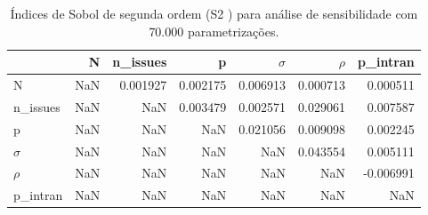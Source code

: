 \begin{table}[H]
\centering
\caption{Índices de Sobol  de segunda ordem (S2 ) para análise de
  sensibilidade com 70.000 parametrizações.}
\label{apptab2}
\begin{tabular}{l|r|r|r|r|r|r|}
\cline{2-7}
                                                        & \cellcolor[HTML]{C0C0C0}N & \cellcolor[HTML]{C0C0C0}n\_issues & \cellcolor[HTML]{C0C0C0}p & \cellcolor[HTML]{C0C0C0}\(\sigma\) & \cellcolor[HTML]{C0C0C0}\(\rho\) & \cellcolor[HTML]{C0C0C0}p\_intran \\ \hline
\multicolumn{1}{|l|}{\cellcolor[HTML]{EFEFEF}N}         & NaN                       & 0.001927                          & 0.002175                  & 0.006913                  & 0.000713                  & 0.000511                          \\ \hline
\multicolumn{1}{|l|}{\cellcolor[HTML]{EFEFEF}n\_issues} & NaN                       & NaN                               & 0.003479                  & 0.002571                  & 0.029061                  & 0.007587                          \\ \hline
\multicolumn{1}{|l|}{\cellcolor[HTML]{EFEFEF}p}         & NaN                       & NaN                               & NaN                       & 0.021056                  & 0.009098                  & 0.002245                          \\ \hline
\multicolumn{1}{|l|}{\cellcolor[HTML]{EFEFEF}\(\sigma\)}         & NaN                       & NaN                               & NaN                       & NaN                       & 0.043554                  & 0.005111                          \\ \hline
\multicolumn{1}{|l|}{\cellcolor[HTML]{EFEFEF}\(\rho\)}         & NaN                       & NaN                               & NaN                       & NaN                       & NaN                       & -0.006991                         \\ \hline
\multicolumn{1}{|l|}{\cellcolor[HTML]{EFEFEF}p\_intran} & NaN                       & NaN                               & NaN                       & NaN                       & NaN                       & NaN                               \\ \hline
\end{tabular}
\vspace{0.1cm}
\end{table}



